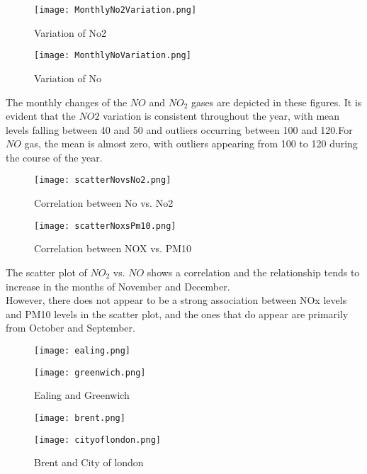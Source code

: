 \documentclass{article}
\begin{document}
	\begin{figure}[h]
		\centering
		\texttt{[image: MonthlyNo2Variation.png]}
		\caption{Variation of No2}
		\label{figure_1}
	\end{figure}
	\begin{figure}[h]
		\centering
		\texttt{[image: MonthlyNoVariation.png]}
		\caption{Variation of No}
		\label{figure_2}
	\end{figure}
	
	The monthly changes of the $NO$ and $NO_2$ gases are depicted in these figures. It is evident that the $NO2$ variation is consistent throughout the year, with mean levels falling between 40 and 50 and outliers occurring between 100 and 120.For $NO$ gas, the mean is almost zero, with outliers appearing from 100 to 120 during the course of the year.
	\newpage
	
	
	

	\begin{figure}[h]
		\centering
		\texttt{[image: scatterNovsNo2.png]}
		\caption{Correlation between No vs. No2}
		\label{figure_3}
	\end{figure}
	\begin{figure}[h]
		\centering
		\texttt{[image: scatterNoxsPm10.png]}
		\caption{Correlation between NOX vs. PM10}
		\label{figure_5}
	\end{figure}
	The scatter plot of $NO_2$ vs. $NO$ shows a correlation and the relationship tends to increase in the months of November and December.\\
	However, there does not appear to be a strong association between NOx levels and PM10 levels in the scatter plot, and the ones that do appear are primarily from October and September.
	
	\newpage
	\begin{figure}[h]
		\begin{minipage}{.5\textwidth}
			\centering
			\texttt{[image: ealing.png]}
			\caption{Ealing and Greenwich}
			\label{figure_4}
		\end{minipage}%
		\begin{minipage}{.5\textwidth}
			\centering
			\texttt{[image: greenwich.png]}
			\label{figure_6}
		\end{minipage}
	\end{figure}

	\begin{figure}[h]
		\begin{minipage}{.5\textwidth}
			\centering
			\texttt{[image: brent.png]}
			\caption{Brent and City of london}
			\label{figure_7}
		\end{minipage}%
		\begin{minipage}{.5\textwidth}
			\centering
			\texttt{[image: cityoflondon.png]}
			\label{figure_8}
		\end{minipage}
	\end{figure}
	
\end{document}
